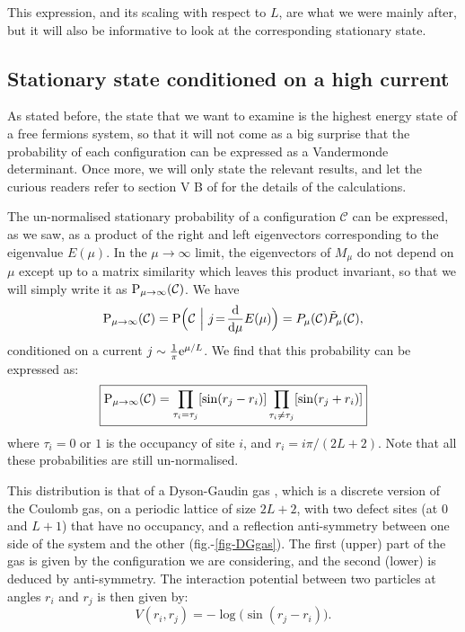 \documentclass[aps,pre,onecolumn,showpacs,showkeys,a4paper]{revtex4-1}
\begin{document}
This expression, and its scaling with respect to $L$, are what we were mainly after, but it will also be informative to look at the corresponding stationary state.



\subsection{Stationary state conditioned on a high current}
\label{IIIc}

As stated before, the state that we want to examine is the highest energy state of a free fermions system, so that it will not come as a big surprise that the probability of each configuration can be expressed as a Vandermonde determinant. Once more, we will only state the relevant results, and let the curious readers refer to section V B of \cite{Lazarescu2015} for the details of the calculations.

The un-normalised stationary probability of a configuration ${\mathcal C}$ can be expressed, as we saw, as a product of the right and left eigenvectors corresponding to the eigenvalue $E(\mu)$. In the $\mu\rightarrow\infty$ limit, the eigenvectors of $M_\mu$ do not depend on $\mu$ except up to a matrix similarity which leaves this product invariant, so that we will simply write it as ${\rm P}_{\mu\rightarrow\infty}({\mathcal C})$. We have
\begin{equation}
{\rm P}_{\mu\rightarrow\infty}({\mathcal C})={\rm P}\Bigl({\mathcal C}~\Big|~j\!=\!\frac{{\rm d}}{{\rm d}\mu} E(\mu)\Bigr)=P_\mu({\mathcal C})\tilde{P}_\mu({\mathcal C}),
\end{equation}
conditioned on a current $j\sim\frac{1}{\pi}{\rm e}^{\mu/L}$. We find that this probability can be expressed as:
\begin{equation}\boxed{
{\rm P}_{\mu\rightarrow\infty}({\mathcal C})=\prod\limits_{\tau_i=\tau_j}[\sin(r_j - r_i)]\prod\limits_{\tau_i\neq \tau_j}[\sin(r_j + r_i)]
}\end{equation}
where $\tau_i=0$ or $1$ is the occupancy of site $i$, and $r_i=i \pi/(2L+2)$. Note that all these probabilities are still un-normalised.

This distribution is that of a Dyson-Gaudin gas \cite{Gaudin1973}, which is a discrete version of the Coulomb gas, on a periodic lattice of size $2L+2$, with two defect sites (at $0$ and $L+1$) that have no occupancy, and a reflection anti-symmetry between one side of the system and the other (fig.-\ref{fig-DGgas}). The first (upper) part of the gas is given by the configuration we are considering, and the second (lower) is deduced by anti-symmetry. The interaction potential between two particles at angles $r_i$ and $r_j$ is then given by:
\begin{equation}
V(r_i,r_j)=-\log\bigl(\sin(r_j - r_i)\bigr).
\end{equation}
\end{document}
